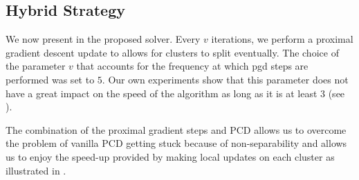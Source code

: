 \subsection{Hybrid Strategy}
\label{sec:hybrid-strategy}

We now present in  the proposed solver.
Every $v$ iterations, we perform a proximal gradient descent update to allows for clusters to split eventually.
The choice of the parameter $v$ that accounts for the frequency at which pgd steps are performed was set to $5$.
Our own experiments show that this parameter does not have a great impact on the speed of the algorithm as long as it is at least $3$ (see ).

The combination of the proximal gradient steps and PCD allows us to overcome the problem of vanilla PCD getting stuck because of non-separability and allows us to enjoy the speed-up provided by making local updates on each cluster as illustrated in .

\begin{algorithm}[h!]
  \caption{%
    Hybrid coordinate descent and proximal gradient descent algorithm
    for SLOPE\label{alg:hybrid}}


  \Return{\(\beta\)}
\end{algorithm}

